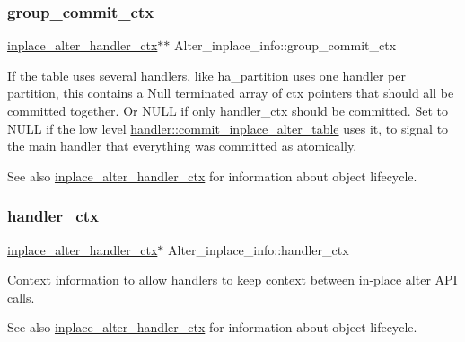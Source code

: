 \subsubsection{\texorpdfstring{group\+\_\+commit\+\_\+ctx}{group\_commit\_ctx}}
{\footnotesize\ttfamily \mbox{\hyperlink{classinplace__alter__handler__ctx}{inplace\+\_\+alter\+\_\+handler\+\_\+ctx}}$\ast$$\ast$ Alter\+\_\+inplace\+\_\+info\+::group\+\_\+commit\+\_\+ctx}

If the table uses several handlers, like ha\+\_\+partition uses one handler per partition, this contains a Null terminated array of ctx pointers that should all be committed together. Or N\+U\+LL if only handler\+\_\+ctx should be committed. Set to N\+U\+LL if the low level \mbox{\hyperlink{classhandler_a0786a5f57ccd3c97bff07b1afeae9c06}{handler\+::commit\+\_\+inplace\+\_\+alter\+\_\+table}} uses it, to signal to the main handler that everything was committed as atomically.

\begin{DoxySeeAlso}{See also}
\mbox{\hyperlink{classinplace__alter__handler__ctx}{inplace\+\_\+alter\+\_\+handler\+\_\+ctx}} for information about object lifecycle. 
\end{DoxySeeAlso}
\mbox{\label{classAlter__inplace__info_a840f4313301458d892e80fd5bb7c6bcd}} 
\subsubsection{\texorpdfstring{handler\+\_\+ctx}{handler\_ctx}}
{\footnotesize\ttfamily \mbox{\hyperlink{classinplace__alter__handler__ctx}{inplace\+\_\+alter\+\_\+handler\+\_\+ctx}}$\ast$ Alter\+\_\+inplace\+\_\+info\+::handler\+\_\+ctx}

Context information to allow handlers to keep context between in-\/place alter A\+PI calls.

\begin{DoxySeeAlso}{See also}
\mbox{\hyperlink{classinplace__alter__handler__ctx}{inplace\+\_\+alter\+\_\+handler\+\_\+ctx}} for information about object lifecycle. 
\end{DoxySeeAlso}
\mbox{\label{classAlter__inplace__info_aacb64dbd4ca006d7203f84e41890dbfd}} 
